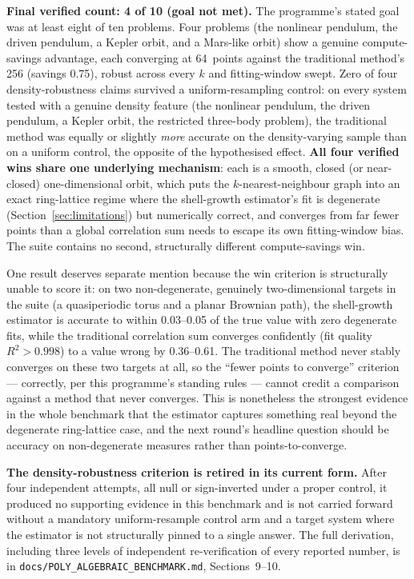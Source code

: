 \documentclass[11pt,a4paper]{article}
\begin{document}
\textbf{Final verified count: 4 of 10 (goal not met).} The programme's
stated goal was at least eight of ten problems. Four problems (the
nonlinear pendulum, the driven pendulum, a Kepler orbit, and a Mars-like
orbit) show a genuine compute-savings advantage, each converging at
64~points against the traditional method's 256 (savings 0.75), robust
across every $k$ and fitting-window swept. Zero of four
density-robustness claims survived a uniform-resampling control: on every
system tested with a genuine density feature (the nonlinear pendulum, the
driven pendulum, a Kepler orbit, the restricted three-body problem), the
traditional method was equally or slightly \emph{more} accurate on the
density-varying sample than on a uniform control, the opposite of the
hypothesised effect. \textbf{All four verified wins share one underlying
mechanism}: each is a smooth, closed (or near-closed) one-dimensional
orbit, which puts the $k$-nearest-neighbour graph into an exact
ring-lattice regime where the shell-growth estimator's fit is degenerate
(Section~\ref{sec:limitations}) but numerically correct, and converges
from far fewer points than a global correlation sum needs to escape its
own fitting-window bias. The suite contains no second, structurally
different compute-savings win.

One result deserves separate mention because the win criterion is
structurally unable to score it: on two non-degenerate, genuinely
two-dimensional targets in the suite (a quasiperiodic torus and a planar
Brownian path), the shell-growth estimator is accurate to within
0.03--0.05 of the true value with zero degenerate fits, while the
traditional correlation sum converges confidently (fit quality
$R^2 > 0.998$) to a value wrong by 0.36--0.61. The traditional method
never stably converges on these two targets at all, so the ``fewer points
to converge'' criterion --- correctly, per this programme's standing
rules --- cannot credit a comparison against a method that never
converges. This is nonetheless the strongest evidence in the whole
benchmark that the estimator captures something real beyond the
degenerate ring-lattice case, and the next round's headline question
should be accuracy on non-degenerate measures rather than points-to-converge.

\textbf{The density-robustness criterion is retired in its current form.}
After four independent attempts, all null or sign-inverted under a proper
control, it produced no supporting evidence in this benchmark and is not
carried forward without a mandatory uniform-resample control arm and a
target system where the estimator is not structurally pinned to a single
answer. The full derivation, including three levels of independent
re-verification of every reported number, is in
\texttt{docs/POLY\_ALGEBRAIC\_BENCHMARK.md}, Sections~9--10.
\end{document}
